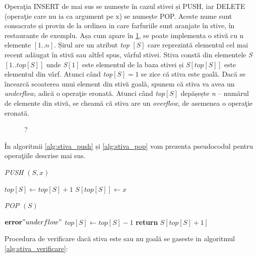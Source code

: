 Operaţia INSERT de mai sus se numește în cazul stivei și PUSH, iar DELETE (operaţie care nu ia ca argument pe x) se numește POP. Aceste nume sunt consacrate și provin de la ordinea in care farfuriile sunt aranjate în stive, în restaurante de exemplu.
Așa cum apare în \ref{fig:structuriDate1}, se poate implementa o stivă cu n elemente $\left [ 1..n \right ]$. Șirul are un atribut \textit{top} $\left [ S \right ] $ care reprezintă elementul cel mai recent adăugat în stivă sau altfel spus, vârful stivei.
Stiva constă din elementele \textit{S}$\left [ 1..\textit{top} \left [ S \right ] \right ]$ unde \textit{S}$\left [ 1 \right ]$ este elementul de la baza stivei și \textit{S}$\left [ \textit{top}\left [ S \right ] \right ]$ este elementul din vârf.
Atunci când \textit{top}$\left [ S \right ] = 1$ se zice că stiva este goală. Dacă se încearcă scoaterea unui element din stivă goală, spunem că stiva va avea un \textit{underflow}, adică o operaţie eronată.
Atunci când \textit{top}$\left [ S \right ]$ depășește \textit{n} – numărul de elemente din stivă, se cheamă că stiva are un \textit{overflow}, de asemenea o operaţie eronată.

\begin{figure}[ht] %
	\centering	
		\caption{?} 
		\label{fig:structuriDate1}
	\end{figure}


În algoritmii \ref{alg:stiva_push} și \ref{alg:stiva_pop} vom prezenta pseudocodul pentru operaţiile descrise mai sus.

\begin{algorithm} [H]
	\caption{\textit{PUSH $\left ( S, x \right )$}}\label{alg:stiva_push}
	\begin{algorithmic}[1]
		\State $top[S]\gets top[S] + 1$
		\State $S[top[S]]\gets x$
	\end{algorithmic}
\end{algorithm}


\begin{algorithm} [H]
	\caption{\textit{POP $\left ( S \right )$}}\label{alg:stiva_pop}
	\begin{algorithmic}[1]
		\State 	$\textbf{error} "underflow"$	
		\Else 
		\State $top[S]\gets top[S] - 1$
		\EndIf	
		\State \textbf{return} ${S[top[S] + 1]}$	
	\end{algorithmic}
\end{algorithm}

Procedura de verificare dacă stiva este sau nu goală se gaseste in algoritmul \ref{alg:stiva_verificare}:

